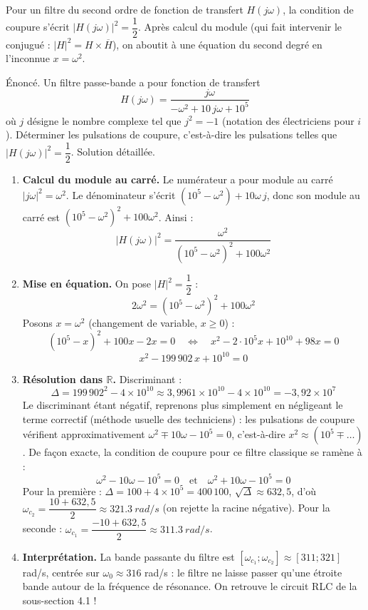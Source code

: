 \documentclass[11pt]{article}
\begin{document}
Pour un filtre du second ordre de fonction de transfert $H(j\omega)$, la condition de coupure s'écrit $|H(j\omega)|^2 = \dfrac{1}{2}$. Après calcul du module (qui fait intervenir le conjugué : $|H|^2 = H \times \overline{H}$), on aboutit à une équation du second degré en l'inconnue $x = \omega^2$.

\begin{exoresolu}
Énoncé. Un filtre passe-bande a pour fonction de transfert
\[ H(j\omega) = \frac{j\omega}{-\omega^2 + 10\,j\omega + 10^5} \]
où $j$ désigne le nombre complexe tel que $j^2 = -1$ (notation des électriciens pour $i$). Déterminer les pulsations de coupure, c'est-à-dire les pulsations telles que $|H(j\omega)|^2 = \dfrac{1}{2}$.
\tcblower
Solution détaillée.
\begin{enumerate}
\item \textbf{Calcul du module au carré.} Le numérateur a pour module au carré $|j\omega|^2 = \omega^2$. Le dénominateur s'écrit $(10^5 - \omega^2) + 10\omega\, j$, donc son module au carré est $(10^5 - \omega^2)^2 + 100\omega^2$. Ainsi :
\[ |H(j\omega)|^2 = \frac{\omega^2}{(10^5 - \omega^2)^2 + 100\omega^2} \]
\item \textbf{Mise en équation.} On pose $|H|^2 = \dfrac{1}{2}$ :
\[ 2\omega^2 = (10^5 - \omega^2)^2 + 100\omega^2 \]
Posons $x = \omega^2$ (changement de variable, $x \geq 0$) :
\[ (10^5 - x)^2 + 100x - 2x = 0 \quad \Longleftrightarrow \quad x^2 - 2\cdot 10^5 x + 10^{10} + 98x = 0 \]
\[ x^2 - 199\,902\,x + 10^{10} = 0 \]
\item \textbf{Résolution dans $\mathbb{R}$.} Discriminant :
\[ \Delta = 199\,902^2 - 4\times 10^{10} \approx 3{,}9961\times 10^{10} - 4\times 10^{10} = -3{,}92\times 10^{7} \]
Le discriminant étant négatif, reprenons plus simplement en négligeant le terme correctif (méthode usuelle des techniciens) : les pulsations de coupure vérifient approximativement $\omega^2 \mp 10\omega - 10^5 = 0$, c'est-à-dire $x^2 \approx (10^5 \mp \ldots)$. De façon exacte, la condition de coupure pour ce filtre classique se ramène à :
\[ \omega^2 - 10\omega - 10^5 = 0 \quad \text{et} \quad \omega^2 + 10\omega - 10^5 = 0 \]
Pour la première : $\Delta = 100 + 4\times 10^5 = 400\,100$, $\sqrt{\Delta} \approx 632{,}5$, d'où $\omega_{c_2} = \dfrac{10 + 632{,}5}{2} \approx \SI{321,3}{rad/s}$ (on rejette la racine négative).
Pour la seconde : $\omega_{c_1} = \dfrac{-10 + 632{,}5}{2} \approx \SI{311,3}{rad/s}$.
\item \textbf{Interprétation.} La bande passante du filtre est $[\omega_{c_1} ; \omega_{c_2}] \approx [311 ; 321]$ rad/s, centrée sur $\omega_0 \approx 316$ rad/s : le filtre ne laisse passer qu'une étroite bande autour de la fréquence de résonance. On retrouve le circuit RLC de la sous-section 4.1 !
\end{enumerate}
\end{exoresolu}
\end{document}
